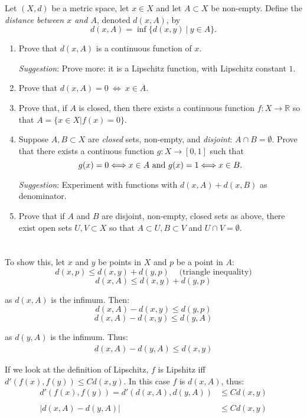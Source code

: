 \documentclass{jhwhw}
\newcommand{\R}{{\mathbb R}}
\begin{document}
\problem{}%
Let $(X,d)$ be a metric space, let $x\in X$ and let $A\subset X$ be non-empty.  Define the \emph{distance between $x$ and $A$}, denoted $d(x,A)$, by
$$
d(x,A) = \inf \{d(x,y)\  | \  y\in A\}.
$$
\begin{enumerate}
	\item Prove that $d(x,A)$ is a continuous function of $x$. 
	
	\emph{Suggestion}:  Prove more: it is a Lipschitz function, with Lipschitz constant $1$.
	
	\item Prove that $d(x,A) = 0\  \Longleftrightarrow \  x\in\overline{A}$.
	
	\item Prove that, if $A$ is closed, then there exists a continuous function $f:X\to\R$ so that $ A = \{x\in X | f(x) = 0\}$.
	
	\item Suppose $A,B\subset X$ are \emph{closed} sets, non-empty, and \emph{disjoint}: $A\cap B = \emptyset$. Prove that there exists a contiuous function $g:X\to [0,1]$ such that 
	$$
	g(x) = 0 \Longleftrightarrow x\in A \hbox{ and } g(x) = 1 \Longleftrightarrow x\in B.
	$$
	
	\emph{Suggestion}: Experiment with  functions with $d(x,A) + d(x,B)$ as denominator.
	
	\item Prove that if $A$ and $B$ are disjoint, non-empty, closed sets as above, there exist open sets $U,V\subset X$ so that $A\subset U, B\subset V$ and $U\cap V = \emptyset$.
\end{enumerate}

\solution{}
\part{}%
To show this, let $x$ and $y$ be points in $X$ and $p$ be a point in $A$:
$$d(x,p) \leq d(x,y) + d(y,p)\ \ \ \ \text{ (triangle inequality)}$$
$$d(x,A) \leq d(x,y) + d(y,p)$$

as $d(x,A)$ is the infimum. Then:
$$ d(x,A) - d(x,y) \leq d(y,p) $$
$$ d(x,A) - d(x,y) \leq d(y,A) $$

as $d(y,A)$ is the infimum. Thus:
\begin{gather}
d(x,A) - d(y,A) \leq d(x,y) \label{eq:ineq}
\end{gather}


If we look at the definition of Lipschitz, $f$ is Lipshitz iff $d'(f(x),f(y)) \leq Cd(x,y)$. In this case $f$ is $d(x,A)$, thus:
\begin{align}
d'(f(x),f(y)) = d'(d(x,A),d(y,A)) &\leq Cd(x,y)  \nonumber\\ 
\nonumber \\
|d(x,A) - d(y,A)| &\leq Cd(x,y)\label{eq:lip}
\end{align}
\end{document}
